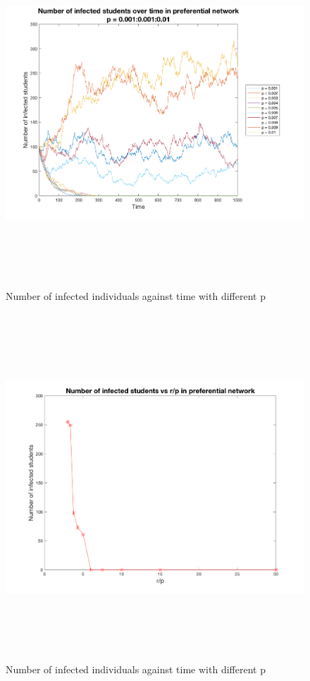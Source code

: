 \documentclass[12pt]{article}
\begin{document}
\begin{figure}[H] %
\centering
\includegraphics[width = 16 cm, height = 13cm]{pnwinf.png}
\caption{Number of infected individuals against time with different p}
\label{fig:pnwinf}
\end{figure}

\begin{figure}[H] %
\centering
\includegraphics[width = 16 cm, height = 13cm]{pnwprp.png}
\caption{Number of infected individuals against time with different p}
\label{fig:pnwprp}
\end{figure}
\end{document}
